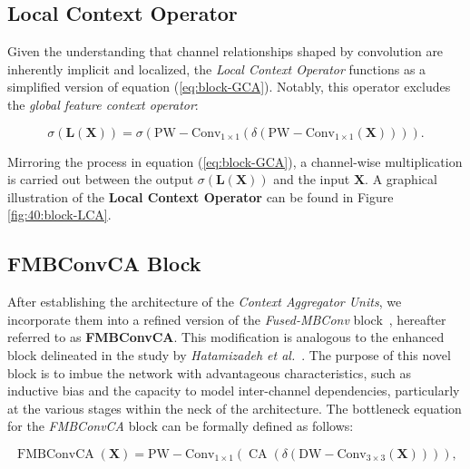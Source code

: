 \subsection{Local Context Operator}
Given the understanding that channel relationships shaped by convolution are inherently implicit and localized, the \textit{Local Context Operator} functions as a simplified version of equation (\ref{eq:block-GCA}). Notably, this operator excludes the \textit{global feature context operator}:

\begin{equation}
\sigma\left(\mathbf{L}(\mathbf{X})\right) = \sigma\left(\operatorname{PW-Conv_{1\times 1}}\left(\delta\left(\operatorname{PW-Conv_{1\times 1}}(\mathbf{X})\right)\right)\right). \label{eq:block-LCA}
\end{equation}

Mirroring the process in equation (\ref{eq:block-GCA}), a channel-wise multiplication is carried out between the output \( \sigma\left(\mathbf{L}(\mathbf{X})\right) \) and the input \( \mathbf{X} \). A graphical illustration of the \textbf{Local Context Operator} can be found in Figure \ref{fig:40:block-LCA}.

\subsection{FMBConvCA Block}
After establishing the architecture of the \textit{Context Aggregator Units}, we incorporate them into a refined version of the \textit{Fused-MBConv} block~\cite{Gupta_Tan2019}, hereafter referred to as \textbf{FMBConvCA}. This modification is analogous to the enhanced block delineated in the study by \textit{Hatamizadeh et al.}~\cite{hatamizadeh2023global}. The purpose of this novel block is to imbue the network with advantageous characteristics, such as inductive bias and the capacity to model inter-channel dependencies, particularly at the various stages within the neck of the architecture.
The bottleneck equation for the \textit{FMBConvCA} block can be formally defined as follows: 

\begin{equation}
\operatorname{FMBConvCA}\left(\mathbf{X}\right) = \operatorname{PW-Conv_{1\times 1}}\left(\operatorname{CA}\left(\delta\left(\operatorname{DW-Conv_{3\times 3}}\left(\mathbf{X}\right)\right)\right)\right), \label{eq:block-FMBC}
\end{equation}

